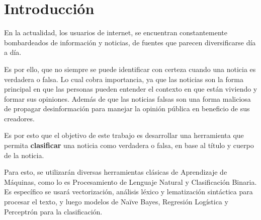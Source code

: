\section{Introducción}
{

En la actualidad, los usuarios de internet, se encuentran constantemente bombardeados de información y noticias, de fuentes que parecen diversificarse día a día. 

Es por ello, que no siempre se puede identificar con certeza cuando una noticia es verdadera o falsa. Lo cual cobra importancia, ya que las noticias son la forma principal en que las personas pueden entender el contexto en que están viviendo y formar sus opiniones. Además de que las noticias falsas son una forma maliciosa de propagar desinformación para manejar la opinión pública en beneficio de sus creadores. 

Es por esto que el objetivo de este trabajo es desarrollar una herramienta que permita \textbf{clasificar} una noticia como verdadera o falsa, en base al título y cuerpo de la noticia.

Para esto, se utilizarán diversas herramientas clásicas de Aprendizaje de Máquinas, como lo es Procesamiento de Lenguaje Natural y Clasificación Binaria. Es específico se usará vectorización, análisis léxico y lematización sintáctica para procesar el texto, y luego modelos de Naïve Bayes, Regresión Logística y Perceptrón para la clasificación. 


}

